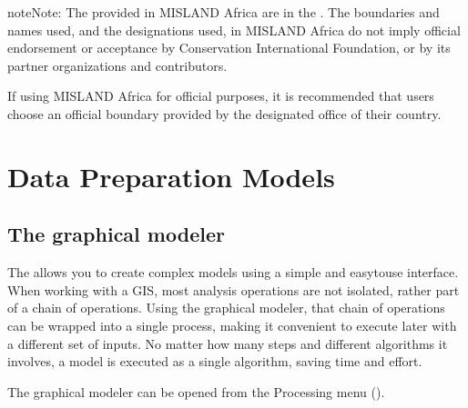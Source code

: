 \documentclass[letterpaper,10pt,english]{sphinxmanual}
\begin{document}
\begin{sphinxadmonition}{note}{Note:}
\sphinxAtStartPar
The  provided in MISLAND Africa
are in the . The boundaries and names used, and the
designations used, in MISLAND Africa do not imply official endorsement or
acceptance by Conservation International Foundation, or by its partner
organizations and contributors.

\sphinxAtStartPar
If using MISLAND Africa for official purposes, it is recommended that users
choose an official boundary provided by the designated office of their
country.
\end{sphinxadmonition}

\sphinxstepscope


\chapter{Data Preparation Models}
\label{\detokenize{Introduction/models:data-preparation-models}}\label{\detokenize{Introduction/models::doc}}

\section{The graphical modeler}
\label{\detokenize{Introduction/models:the-graphical-modeler}}
\sphinxAtStartPar
The  allows you to create complex models using
a simple and easy\sphinxhyphen{}to\sphinxhyphen{}use interface.
When working with a GIS, most analysis operations are not
isolated, rather part of a chain of operations.
Using the graphical modeler, that chain of operations can be wrapped
into a single process, making it convenient to execute later with a
different set of inputs.
No matter how many steps and different algorithms it involves, a
model is executed as a single algorithm, saving time and effort.

\sphinxAtStartPar
The graphical modeler can be opened from the Processing menu
().
\end{document}
